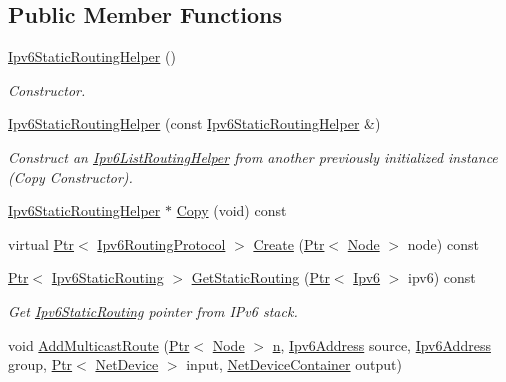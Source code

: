 \subsection*{Public Member Functions}
\begin{DoxyCompactItemize}
\item 
\hyperlink{classns3_1_1Ipv6StaticRoutingHelper_ae72254093470eae64213505e1a17c567}{Ipv6\+Static\+Routing\+Helper} ()
\begin{DoxyCompactList}\small\item\em Constructor. \end{DoxyCompactList}\item 
\hyperlink{classns3_1_1Ipv6StaticRoutingHelper_ad6606fcb427f3261f2d2d9d2c5ab5c8b}{Ipv6\+Static\+Routing\+Helper} (const \hyperlink{classns3_1_1Ipv6StaticRoutingHelper}{Ipv6\+Static\+Routing\+Helper} \&)
\begin{DoxyCompactList}\small\item\em Construct an \hyperlink{classns3_1_1Ipv6ListRoutingHelper}{Ipv6\+List\+Routing\+Helper} from another previously initialized instance (Copy Constructor). \end{DoxyCompactList}\item 
\hyperlink{classns3_1_1Ipv6StaticRoutingHelper}{Ipv6\+Static\+Routing\+Helper} $\ast$ \hyperlink{classns3_1_1Ipv6StaticRoutingHelper_a984170f1188bad7e980a21c81990a304}{Copy} (void) const 
\item 
virtual \hyperlink{classns3_1_1Ptr}{Ptr}$<$ \hyperlink{classns3_1_1Ipv6RoutingProtocol}{Ipv6\+Routing\+Protocol} $>$ \hyperlink{classns3_1_1Ipv6StaticRoutingHelper_aeed733513c2f46bbe03fcd2c0370f493}{Create} (\hyperlink{classns3_1_1Ptr}{Ptr}$<$ \hyperlink{classns3_1_1Node}{Node} $>$ node) const 
\item 
\hyperlink{classns3_1_1Ptr}{Ptr}$<$ \hyperlink{classns3_1_1Ipv6StaticRouting}{Ipv6\+Static\+Routing} $>$ \hyperlink{classns3_1_1Ipv6StaticRoutingHelper_a50e42745077d7bcfd371df331879fae9}{Get\+Static\+Routing} (\hyperlink{classns3_1_1Ptr}{Ptr}$<$ \hyperlink{classns3_1_1Ipv6}{Ipv6} $>$ ipv6) const 
\begin{DoxyCompactList}\small\item\em Get \hyperlink{classns3_1_1Ipv6StaticRouting}{Ipv6\+Static\+Routing} pointer from I\+Pv6 stack. \end{DoxyCompactList}\item 
void \hyperlink{classns3_1_1Ipv6StaticRoutingHelper_a65007098b4ba329479010f5bbba3eb90}{Add\+Multicast\+Route} (\hyperlink{classns3_1_1Ptr}{Ptr}$<$ \hyperlink{classns3_1_1Node}{Node} $>$ \hyperlink{lte__link__budget__x2__handover__measures_8m_abdb05bc5a064cf642a06c83b3392f148}{n}, \hyperlink{classns3_1_1Ipv6Address}{Ipv6\+Address} source, \hyperlink{classns3_1_1Ipv6Address}{Ipv6\+Address} group, \hyperlink{classns3_1_1Ptr}{Ptr}$<$ \hyperlink{classns3_1_1NetDevice}{Net\+Device} $>$ input, \hyperlink{classns3_1_1NetDeviceContainer}{Net\+Device\+Container} output)

\end{DoxyCompactItemize}
